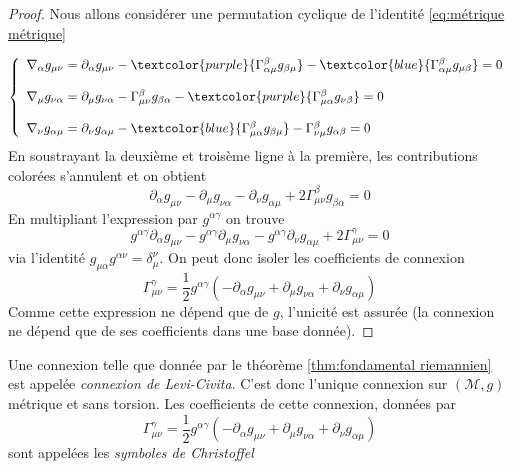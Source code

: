 \begin{proof}
Nous allons considérer une permutation cyclique de l'identité \ref{eq:métrique métrique}

\begin{equation}
\left\{
\begin{array}{l}
\nabla_{\alpha}g_{\mu \nu} = \partial_{\alpha}g_{\mu \nu} - \textcolor{purple}{\Gamma^{\beta}_{\alpha \mu}g_{\beta \mu}} - \textcolor{blue}{\Gamma^{\beta}_{\alpha \mu}g_{\mu \beta}} = 0 \\
\\
\nabla_{\mu}g_{ \nu \alpha } = \partial_{\mu}g_{\nu \alpha} - \Gamma^{\beta}_{\mu \nu}g_{\beta \alpha} - \textcolor{purple}{\Gamma^{\beta}_{\mu \alpha}g_{\nu \beta}} = 0 \\
\\
\nabla_{\nu}g_{ \alpha \mu } = \partial_{\nu}g_{\alpha \mu} - \textcolor{blue}{\Gamma^{\beta}_{\mu \alpha}g_{\beta \mu}} - \Gamma^{\beta}_{\nu \mu}g_{\alpha \beta} = 0 \\
\end{array}
\right.
\end{equation}
En soustrayant la deuxième et troisème ligne à la première, les contributions colorées s'annulent et on obtient
\begin{equation}
    \partial_{\alpha}g_{\mu \nu} - \partial_{\mu}g_{\nu \alpha} - \partial_{\nu}g_{\alpha \mu} +2\Gamma^{\beta}_{\mu \nu} g_{\beta \alpha} = 0
\end{equation}
En multipliant l'expression par $g^{\alpha\gamma}$ on trouve 
\begin{equation}
     g^{\alpha \gamma}\partial_{\alpha}g_{\mu \nu} - g^{\alpha \gamma}\partial_{\mu}g_{\nu \alpha} - g^{\alpha \gamma}\partial_{\nu}g_{\alpha \mu} +2\Gamma^{\gamma}_{\mu \nu}  =0
\end{equation}
via l'identité $g_{\mu\alpha} g^{\alpha\nu} = \delta_\mu^\nu$. On peut donc isoler les coefficients de connexion
\begin{equation}
    \Gamma^{\gamma}_{\mu \nu} = \frac{1}{2}g^{\alpha \gamma}( - \partial_{\alpha}g_{\mu \nu} + \partial_{\mu}g_{\nu \alpha} + \partial_{\nu}g_{\alpha \mu})
\end{equation}
Comme cette expression ne dépend que de $g$, l'unicité est assurée (la connexion ne dépend que de ses coefficients dans une base donnée).
\end{proof}
\begin{theoremframe}
    \begin{defi}
        Une connexion telle que donnée par le théorème \ref{thm:fondamental riemannien} est appelée \emph{connexion de Levi-Civita}. C'est donc l'unique connexion sur $(\mathcal{M},g)$ métrique et sans torsion. Les coefficients de cette connexion, données par
        \begin{equation}
            \boxed{\Gamma^{\gamma}_{\mu \nu} = \frac{1}{2}g^{\alpha \gamma}( - \partial_{\alpha}g_{\mu \nu} + \partial_{\mu}g_{\nu \alpha} + \partial_{\nu}g_{\alpha \mu})}
    \label{Connexion de Levi-Civita}
        \end{equation}
        sont appelées les \emph{symboles de Christoffel}
    \end{defi}
\end{theoremframe}
